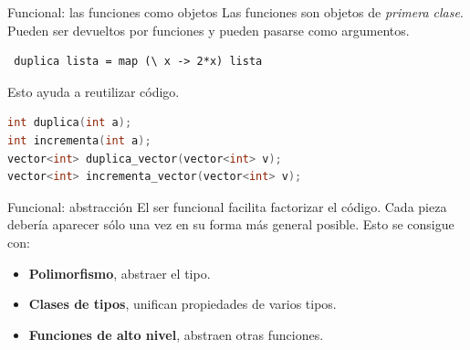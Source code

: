 \begin{frame}[fragile]{Funcional: las funciones como objetos}
 Las funciones son objetos de \textit{primera clase}. Pueden ser devueltos
 por funciones y pueden pasarse como argumentos.

 \begin{lstlisting}
 duplica lista = map (\ x -> 2*x) lista
 \end{lstlisting}

 \espacio
 Esto ayuda a reutilizar código.
 \begin{lstlisting}[language=C++]
int duplica(int a);
int incrementa(int a);
vector<int> duplica_vector(vector<int> v);
vector<int> incrementa_vector(vector<int> v);
 \end{lstlisting}

  
\end{frame}

\begin{frame}[fragile]{Funcional: abstracción}
  El ser funcional facilita factorizar el código. Cada
  pieza debería aparecer sólo una vez en su forma más
  general posible. Esto se consigue con:

  \begin{itemize}
   \item \textbf{Polimorfismo}, abstraer el tipo.
   \item \textbf{Clases de tipos}, unifican propiedades de varios tipos.
   \item \textbf{Funciones de alto nivel}, abstraen otras funciones.
  \end{itemize}


\end{frame}


